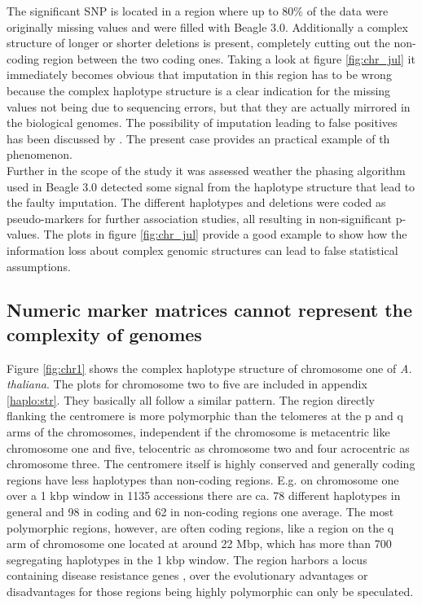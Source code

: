 The significant SNP is located in a region where up to 80\% of the data were originally
missing values and were filled with Beagle 3.0. Additionally a complex structure of longer
or shorter deletions is present, completely cutting out the non-coding region between the
two coding ones. Taking a look at figure \ref{fig:chr_jul} it immediately becomes obvious
that imputation in this region has to be wrong because the complex haplotype structure is
a clear indication for the missing values not being due to sequencing errors, but that
they are actually mirrored in the biological genomes. The possibility of imputation
leading to false positives has been discussed by \cite{lin2010new}. The present case
provides an practical example of th phenomenon. \\
Further in the scope of the study it was assessed weather the phasing algorithm used in
Beagle 3.0 detected some signal from the haplotype structure that lead to the faulty
imputation. The different haplotypes and deletions were coded as pseudo-markers for
further association studies, all resulting in non-significant p-values. The plots in
figure \ref{fig:chr_jul} provide a good example to show how the information loss about
complex genomic structures can lead to false statistical assumptions.

\subsection{Numeric marker matrices cannot represent the complexity of genomes}

Figure \ref{fig:chr1} shows the complex haplotype structure of chromosome one of
\textit{A. thaliana}. The plots for chromosome two to five are included in appendix
\ref{haplo:str}. They basically all follow a similar pattern. The region directly flanking
the centromere is more polymorphic than the telomeres at the p and q arms of the
chromosomes, independent if the chromosome is metacentric like chromosome one and five,
telocentric as chromosome two and four acrocentric as chromosome three. The centromere
itself is highly conserved and generally coding regions have less haplotypes than
non-coding regions. E.g. on chromosome one over a 1 kbp window in 1135 accessions there are
ca. 78 different haplotypes in general and 98 in coding and 62 in non-coding regions one
average. The most polymorphic regions, however, are often coding regions, like a region on
the q arm of chromosome one located at around 22 Mbp, which has more than 700 segregating
haplotypes in the 1 kbp window. The region harbors a locus containing disease resistance
genes \cite{cheng2017araport11}, over the evolutionary advantages or disadvantages for
those regions being highly polymorphic can only be speculated.

